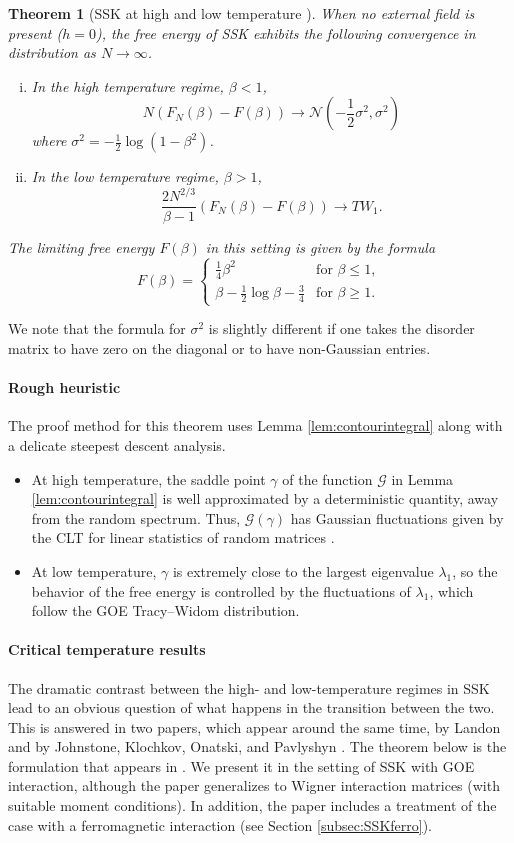 \documentclass[11pt]{article}
\numberwithin{equation}{section}
\newcommand{\beq}{ \begin{equation} }
\newcommand{\eeq}{ \end{equation} }
\def \b {\beta}
\def \la {\lambda}
\def \s {\sigma}
\def \cN {\mathcal{N}}
\def \cG {\mathcal{G}}
\newtheorem{theorem}{Theorem}[section]
\theoremstyle{remark}
\begin{document}
\begin{theorem}[SSK at high and low temperature \cite{BL16}] 
When no external field is present ($h=0$), the free energy of SSK exhibits the following convergence in distribution as $N\to\infty$.
\begin{enumerate}[(i)]
\item In the high temperature regime, $\b<1$,
\beq
N(F_N(\b)-F(\b))\to\cN(-\frac12 \s^2,\s^2)
\eeq
where
$\s^2=-\frac12\log(1-\b^2)$.  

\item In the low temperature regime, $\b>1$,
\beq
\frac{2N^{2/3}}{\b-1}(F_N(\b)-F(\b))\to TW_1.
\eeq
\end{enumerate} 
The limiting free energy $F(\b)$ in this setting is given by the formula
\beq\label{eq:limitingF_SSK}
F(\b)=\begin{cases}
\frac14\b^2& \text{for }\b\leq1,\\
\b-\frac12\log\b-\frac34 & \text{for }\b\geq1.
\end{cases}
\eeq
\end{theorem}

We note that the formula for $\s^2$ is slightly different if one takes the disorder matrix to have zero on the diagonal or to have non-Gaussian entries.

\paragraph{Rough heuristic} The proof method for this theorem uses Lemma \ref{lem:contourintegral} along with a delicate steepest descent analysis.  
\begin{itemize}
\item At high temperature, the saddle point $\gamma$ of the function $\cG$ in Lemma \ref{lem:contourintegral} is well approximated by a deterministic quantity, away from the random spectrum.  Thus, $\cG(\gamma)$ has Gaussian fluctuations given by the CLT for linear statistics of random matrices \cite{Johansson98}.
\item At low temperature, $\gamma$ is extremely close to the largest eigenvalue $\la_1$, so the behavior of the free energy is controlled by the fluctuations of $\la_1$, which follow the GOE Tracy--Widom distribution.
\end{itemize}
\paragraph{Critical temperature results} The dramatic contrast between the high- and low-temperature regimes in SSK lead to an obvious question of what happens in the transition between the two.  This is answered in two papers, which appear around the same time, by Landon \cite{Landon22} and by Johnstone, Klochkov, Onatski, and Pavlyshyn \cite{JKOP2}.  The theorem below is the formulation that appears in \cite{JKOP2}.  We present it in the setting of SSK with GOE interaction, although the paper generalizes to Wigner interaction matrices (with suitable moment conditions).  In addition, the paper includes a treatment of the case with a ferromagnetic interaction (see Section \ref{subsec:SSKferro}).
\end{document}

